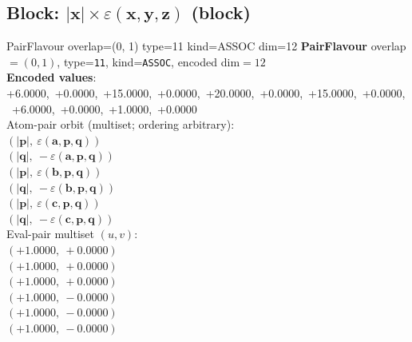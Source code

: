 \documentclass[a4paper,11pt]{article}
\newcommand{\vc}[1]{\ensuremath{\mathbf{#1}}}
\newcommand{\dnfagmiihhiejm}[1]{|\vc{#1}|}
\newcommand{\kblbmcpggoncpf}[3]{\varepsilon(\mathbf{#1},\mathbf{#2},\mathbf{#3})}
\begin{document}
\subsection{Block: $\dnfagmiihhiejm{x} \times \kblbmcpggoncpf{x}{y}{z}$  (block)}
    PairFlavour  overlap=(0, 1)  type=11  kind=ASSOC  dim=12
\textbf{PairFlavour} overlap$=(0, 1)$, type=\texttt{11}, kind=\texttt{ASSOC}, encoded dim$=12$\\
\textbf{      Encoded values}: +6.0000,\ +0.0000,\ +15.0000,\ +0.0000,\ +20.0000,\ +0.0000,\ +15.0000,\ +0.0000,\ +6.0000,\ +0.0000,\ +1.0000,\ +0.0000\\
\quad Atom-pair orbit (multiset; ordering arbitrary):\\
$(\dnfagmiihhiejm{p},\ \kblbmcpggoncpf{a}{p}{q})$\\
$(\dnfagmiihhiejm{q},\ -\kblbmcpggoncpf{a}{p}{q})$\\
$(\dnfagmiihhiejm{p},\ \kblbmcpggoncpf{b}{p}{q})$\\
$(\dnfagmiihhiejm{q},\ -\kblbmcpggoncpf{b}{p}{q})$\\
$(\dnfagmiihhiejm{p},\ \kblbmcpggoncpf{c}{p}{q})$\\
$(\dnfagmiihhiejm{q},\ -\kblbmcpggoncpf{c}{p}{q})$\\
\quad Eval-pair multiset $(u, v)$:\\
$(+1.0000,\ +0.0000)$\\
$(+1.0000,\ +0.0000)$\\
$(+1.0000,\ +0.0000)$\\
$(+1.0000,\ -0.0000)$\\
$(+1.0000,\ -0.0000)$\\
$(+1.0000,\ -0.0000)$\\
\end{document}
